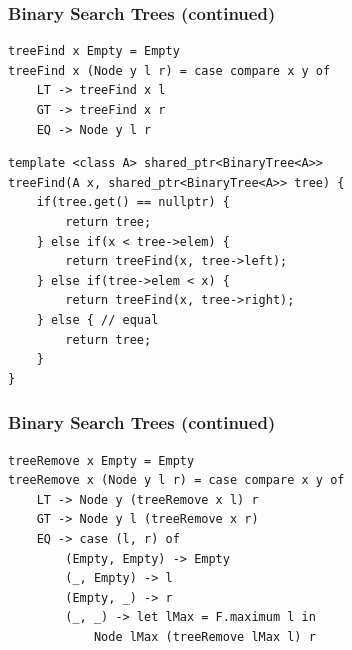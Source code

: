 \documentclass{beamer}
\begin{document}
\begin{frame}[fragile]
\frametitle{Binary Search Trees (continued)}
\begin{Verbatim}[frame=single, fontsize=\scriptsize]
treeFind x Empty = Empty
treeFind x (Node y l r) = case compare x y of
    LT -> treeFind x l
    GT -> treeFind x r
    EQ -> Node y l r
\end{Verbatim}
\begin{Verbatim}[frame=single, fontsize=\scriptsize]
template <class A> shared_ptr<BinaryTree<A>>
treeFind(A x, shared_ptr<BinaryTree<A>> tree) {
    if(tree.get() == nullptr) {
        return tree;
    } else if(x < tree->elem) {
        return treeFind(x, tree->left);
    } else if(tree->elem < x) {
        return treeFind(x, tree->right);
    } else { // equal
        return tree;
    }
}
\end{Verbatim}
\end{frame}


\begin{frame}[fragile]
\frametitle{Binary Search Trees (continued)}
\begin{Verbatim}[frame=single, fontsize=\scriptsize]
treeRemove x Empty = Empty
treeRemove x (Node y l r) = case compare x y of
    LT -> Node y (treeRemove x l) r
    GT -> Node y l (treeRemove x r)
    EQ -> case (l, r) of
        (Empty, Empty) -> Empty
        (_, Empty) -> l
        (Empty, _) -> r
        (_, _) -> let lMax = F.maximum l in
            Node lMax (treeRemove lMax l) r 
\end{Verbatim}
\end{frame}
\end{document}
